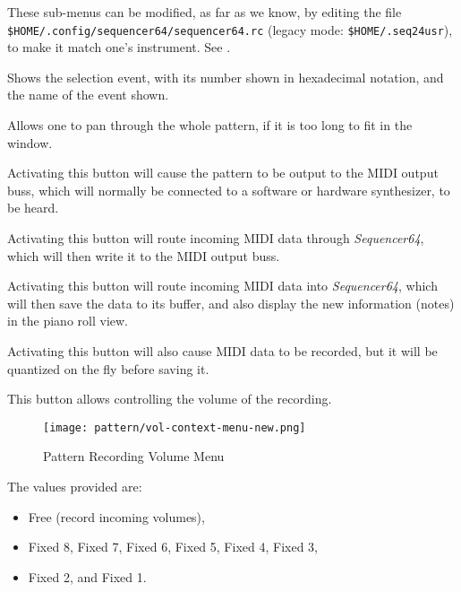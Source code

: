    These sub-menus can be modified, as far as we know, by editing
   the file \texttt{\$HOME/.config/sequencer64/sequencer64.rc}
   (legacy mode: \texttt{\$HOME/.seq24usr}), to make it match one's
   instrument.  See .

   Shows the selection event, with its number shown in hexadecimal notation,
   and the name of the event shown.

   Allows one to pan through the whole pattern, if it is too long to fit in
   the window.

   Activating this button will cause the pattern to be output to the MIDI
   output buss, which will normally be connected to a software or hardware
   synthesizer, to be heard.

   Activating this button will route incoming MIDI data through
   \textsl{Sequencer64}, which will then write it to the MIDI output buss.

   Activating this button will route incoming MIDI data into
   \textsl{Sequencer64}, which will then save the data to its buffer, and also
   display the new information (notes) in the piano roll view.

   Activating this button will also cause MIDI data to be recorded, but it
   will be quantized on the fly before saving it.

   This button allows controlling the volume of the recording.

\begin{figure}[H]
   \centering 
   \texttt{[image: pattern/vol-context-menu-new.png]}
   \caption{Pattern Recording Volume Menu}
   \label{fig:pattern_edit_recording_volume_menu}
\end{figure}

   The values provided are:

   \begin{itemize}
      \item Free (record incoming volumes),
      \item Fixed 8, Fixed 7, Fixed 6, Fixed 5, Fixed 4, Fixed 3,
      \item Fixed 2, and Fixed 1.
   \end{itemize}

